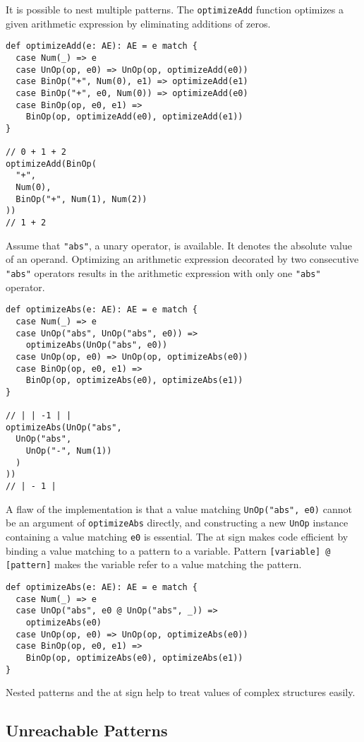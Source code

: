 It is possible to nest multiple patterns. The \verb!optimizeAdd! function
optimizes a given arithmetic expression by eliminating additions of zeros.

\begin{verbatim}
def optimizeAdd(e: AE): AE = e match {
  case Num(_) => e
  case UnOp(op, e0) => UnOp(op, optimizeAdd(e0))
  case BinOp("+", Num(0), e1) => optimizeAdd(e1)
  case BinOp("+", e0, Num(0)) => optimizeAdd(e0)
  case BinOp(op, e0, e1) =>
    BinOp(op, optimizeAdd(e0), optimizeAdd(e1))
}

// 0 + 1 + 2
optimizeAdd(BinOp(
  "+",
  Num(0),
  BinOp("+", Num(1), Num(2))
))
// 1 + 2
\end{verbatim}

Assume that \verb!"abs"!, a unary operator, is available. It denotes the absolute
value of an operand. Optimizing an arithmetic expression decorated by two
consecutive \verb!"abs"! operators results in the arithmetic expression with only
one \verb!"abs"! operator.

\begin{verbatim}
def optimizeAbs(e: AE): AE = e match {
  case Num(_) => e
  case UnOp("abs", UnOp("abs", e0)) =>
    optimizeAbs(UnOp("abs", e0))
  case UnOp(op, e0) => UnOp(op, optimizeAbs(e0))
  case BinOp(op, e0, e1) =>
    BinOp(op, optimizeAbs(e0), optimizeAbs(e1))
}

// | | -1 | |
optimizeAbs(UnOp("abs",
  UnOp("abs",
    UnOp("-", Num(1))
  )
))
// | - 1 |
\end{verbatim}

A flaw of the implementation is that a value matching \verb!UnOp("abs", e0)!
cannot be an argument of \verb!optimizeAbs! directly, and constructing a new
\verb!UnOp! instance containing a value matching \verb!e0! is essential. The at
sign makes code efficient by binding a value matching to a pattern to a variable.
Pattern \verb![variable] @ [pattern]! makes the variable refer to a value
matching the pattern.

\begin{verbatim}
def optimizeAbs(e: AE): AE = e match {
  case Num(_) => e
  case UnOp("abs", e0 @ UnOp("abs", _)) =>
    optimizeAbs(e0)
  case UnOp(op, e0) => UnOp(op, optimizeAbs(e0))
  case BinOp(op, e0, e1) =>
    BinOp(op, optimizeAbs(e0), optimizeAbs(e1))
}
\end{verbatim}

Nested patterns and the at sign help to treat values of complex structures
easily.

\subsection{Unreachable Patterns}

